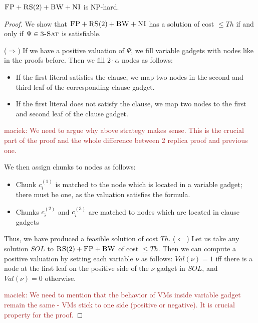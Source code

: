 \documentclass[9pt]{sigcomm-alternate}
\newcommand{\maciek}[1]{\textcolor{brown}{maciek: #1}}
\newcommand{\variab}{\nu}
\newcommand{\clauses}{\alpha}
\newcommand{\achunk}{\ensuremath{c}}
\newcommand{\CC}{\textsc{NI}}
\newcommand{\FP}{\textsc{FP}}
\newcommand{\RS}{\textsc{RS}}
\newcommand{\BW}{\textsc{BW}}
\newcommand{\TSAT}{\textsc{3-Sat}}
\newcommand{\Formula}{\ensuremath{\Psi}}
\newcommand{\Thr}{\ensuremath{Th}}
\newcommand{\Val}{\ensuremath{Val}}
\newcommand{\Sol}{\ensuremath{SOL}}
\begin{document}
\begin{appendix}
\begin{theorem}
$\FP+\RS(2)+\BW+\CC$ is NP-hard.
\end{theorem}
\begin{proof}
We show that $\FP+\RS(2)+\BW+\CC$ has a solution of cost $\leq
  \Thr$ if and only if $\Formula\in \TSAT$ is satisfiable.

($\Rightarrow$) If we have a positive valuation of $\Formula$, we fill variable gadgets with nodes like in
the proofs before. Then we fill $2 \cdot \clauses$ nodes as follows:
\begin{itemize}
\item If the first literal satisfies the clause, we map two nodes in the second and
third leaf of the corresponding clause gadget.
\item If the first literal does not satisfy the clause, we map two nodes to the first
and second leaf of the clause gadget.
\end{itemize}

\maciek{We need to argue why above strategy makes sense. This is the crucial part of the proof and the whole difference between 2 replica proof and previous one.}

We then assign chunks to nodes as follows:
\begin{itemize}
\item Chunk $\achunk_i^{(1)}$ is matched to the node which is located in a variable gadget; there
must be one, as the valuation satisfies the formula.
\item Chunks $\achunk_i^{(2)}$ and $\achunk_i^{(3)}$ are matched to nodes which
are
located in clause
gadgets
\end{itemize}

Thus, we have produced a feasible solution of cost $\Thr$.
($\Leftarrow$)
Let us take any solution $\Sol$ to $\RS(2)+\FP+\BW$ of cost $\leq \Thr$.
Then we can compute a positive valuation by setting each variable $\variab$
as follows:
$\Val(\variab)= 1$ iff there is a node at the first leaf on the positive side of the $\variab$ gadget in $\Sol$,
and $\Val(\variab)=0$ otherwise.

\maciek{We need to mention that the behavior of VMs inside variable gadget remain the same - VMs stick to one side (positive or negative). It is crucial property for the proof.}



\end{proof}
\end{appendix}
\end{document}

